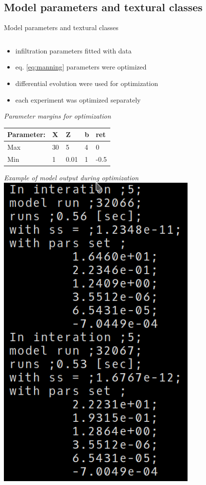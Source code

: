 \subsection{Model parameters and textural classes}
\begin{block}{Model parameters and textural classes}
\begin{columns}
    \begin{column}{0.2\textwidth}
            \begin{itemize}
                \item infiltration parameters fitted with data
                \item eq. \ref{eq:manning} parameters were optimized
                \item differential evolution were used for optimization
                \item each experiment was optimized separately
            \end{itemize}
            {\it Parameter margins for optimization}
        \begin{table}[]
            \small
            \begin{tabular}{lllll}
            \hline
            \hline
            Parameter: & X & Z & b & ret \\
            \hline
            Max & 30 & 5 & 4 & 0 \\
            Min & 1 & 0.01 & 1 & -0.5 \\
            \hline
            \hline
            \end{tabular}
        \end{table}
        \vspace{1.5cm}
        \centering
        {\it Example of model output during optimization}
        \includegraphics[width = 0.75\textwidth]{obr/cli.png}

\end{column}
\end{columns}
\end{block}
